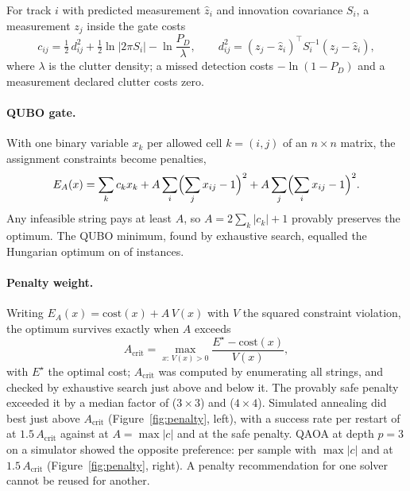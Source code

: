 \documentclass[11pt,a4paper]{article}
\begin{document}
For track $i$ with predicted measurement $\hat z_i$ and innovation covariance $S_i$, a measurement $z_j$ inside the gate costs
\begin{equation}
c_{ij} = \tfrac12\, d_{ij}^2 + \tfrac12 \ln\left|2\pi S_i\right| - \ln\frac{P_D}{\lambda},\qquad d_{ij}^2 = (z_j-\hat z_i)^\top S_i^{-1}(z_j-\hat z_i),
\end{equation}
where $\lambda$ is the clutter density; a missed detection costs $-\ln(1-P_D)$ and a measurement declared clutter costs zero.

\paragraph{QUBO gate.} With one binary variable $x_k$ per allowed cell $k=(i,j)$ of an $n\times n$ matrix, the assignment constraints become
penalties,
\begin{equation}
E_A(x) = \sum_k c_k x_k + A\sum_{i}\Bigl(\sum_{j} x_{ij}-1\Bigr)^2 + A\sum_{j}\Bigl(\sum_{i} x_{ij}-1\Bigr)^2 .
\end{equation}
Any infeasible string pays at least $A$, so $A = 2\sum_k|c_k| + 1$ provably preserves the optimum. The QUBO minimum, found by exhaustive
search, equalled the Hungarian optimum on \PoneGatePassed{} of \PoneGateInstances{} instances.

\paragraph{Penalty weight.} Writing $E_A(x) = \mathrm{cost}(x) + A\,V(x)$ with $V$ the squared constraint violation, the optimum survives
exactly when $A$ exceeds
\begin{equation}
A_\mathrm{crit} = \max_{x:\,V(x)>0} \frac{E^\star - \mathrm{cost}(x)}{V(x)} ,
\end{equation}
with $E^\star$ the optimal cost; $A_\mathrm{crit}$ was computed by enumerating all strings, and checked by exhaustive search just above and
below it. The provably safe penalty exceeded it by a median factor of \PoneSafeOverCritThree{} ($3\times3$) and
\PoneSafeOverCritFour{} ($4\times4$). Simulated annealing did best just above $A_\mathrm{crit}$ (Figure~\ref{fig:penalty}, left), with a
success rate per restart of \PoneSAOracle{} at $1.5\,A_\mathrm{crit}$ against \PoneSAMaxAbs{} at $A = \max|c|$ and \PoneSASafe{} at the
safe penalty. QAOA at depth $p=3$ on a simulator showed the opposite preference: \PoneQAOAMaxAbsThree{} per sample with $\max|c|$ and
\PoneQAOAOracleThree{} at $1.5\,A_\mathrm{crit}$ (Figure~\ref{fig:penalty}, right). A penalty recommendation for one solver cannot be
reused for another.
\end{document}
